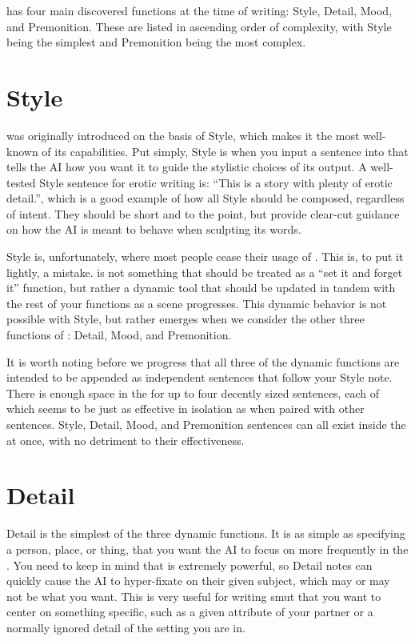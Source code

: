 \documentclass[Coomer-main.tex]{subfiles}
\begin{document}
\an has four main discovered functions at the time of writing: Style, Detail, Mood, and Premonition.
These are listed in ascending order of complexity, with Style being the simplest and Premonition being the most complex.

\section{Style}
\label{sec:anstyle}

\an was originally introduced on the basis of Style, which makes it the most well-known of its capabilities.
Put simply, Style is when you input a sentence into \an that tells the AI how you want it to guide the stylistic choices of its output.
A well-tested Style sentence for erotic writing is: “This is a story with plenty of erotic detail.”, which is a good example of how all Style \ans should be composed, regardless of intent.
They should be short and to the point, but provide clear-cut guidance on how the AI is meant to behave when sculpting its words.

Style is, unfortunately, where most people cease their usage of \an.
This is, to put it lightly, a mistake.
\an is not something that should be treated as a “set it and forget it” function, but rather a dynamic tool that should be updated in tandem with the rest of your functions as a scene progresses.
This dynamic behavior is not possible with Style, but rather emerges when we consider the other three functions of \an: Detail, Mood, and Premonition.

It is worth noting before we progress that all three of the dynamic functions are intended to be appended as independent sentences that follow your Style note.
There is enough space in the \an for up to four decently sized sentences, each of which seems to be just as effective in isolation as when paired with other sentences.
Style, Detail, Mood, and Premonition sentences can all exist inside the \an at once, with no detriment to their effectiveness.

\section{Detail}

Detail is the simplest of the three dynamic \an functions.
It is as simple as specifying a person, place, or thing, that you want the AI to focus on more frequently in the \an.
You need to keep in mind that \an is extremely powerful, so Detail notes can quickly cause the AI to hyper-fixate on their given subject, which may or may not be what you want.
This is very useful for writing smut that you want to center on something specific, such as a given attribute of your partner or a normally ignored detail of the setting you are in.
\end{document}
